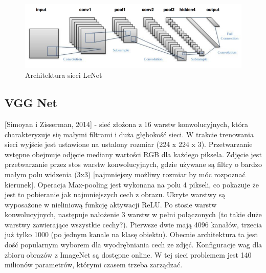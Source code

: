 \documentclass[a4paper,twoside,titlepage,openright]{book}
\begin{document}
\begin{figure}[h]
	\centering
			\includegraphics[resolution=120]{LeNet.png}
		\caption{Architektura sieci LeNet}
\end{figure}

\subsection{VGG Net}
 [Simoyan i Zisserman, 2014] - sieć złożona z 16 warstw konwolucyjnych, która charakteryzuje się małymi filtrami i duża głębokość sieci.
W trakcie trenowania sieci wyjście jest ustawione na ustalony rozmiar (224 x 224 x 3). Przetwarzanie wstępne obejmuje odjęcie mediany wartości RGB dla każdego piksela. Zdjęcie jest przetwarzanie przez stos warstw konwolucyjnych, gdzie używane są filtry o bardzo małym polu widzenia (3x3) [najmniejszy możliwy rozmiar by móc rozpoznać kierunek]. Operacja Max-pooling jest wykonana na polu 4 pikseli, co pokazuje że jest to pobieranie jak najmniejszych cech z obrazu. Ukryte warstwy są wyposażone w nieliniową funkcję aktywacji ReLU. Po stosie warstw konwolucyjnych, następuje nałożenie 3 warstw w pełni połączonych (to takie duże warstwy zawierające wszystkie cechy?). Pierwsze dwie mają 4096 kanałów, trzecia już tylko 1000 (po jednym kanale na klasę obiektu). Obecnie architektura ta jest dość popularnym wyborem dla wyodrębniania cech ze zdjęć. Konfiguracje wag dla zbioru obrazów z ImageNet są dostępne online. W tej sieci problemem jest 140 milionów parametrów, którymi czasem trzeba zarządzać.
\end{document}
